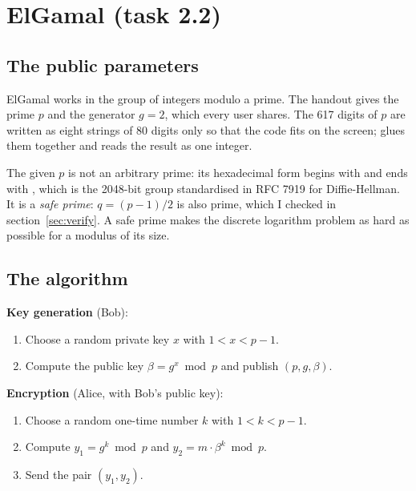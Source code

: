 \documentclass[11pt,a4paper]{article}
\begin{document}
\section{ElGamal (task 2.2)}

\subsection{The public parameters}

ElGamal works in the group of integers modulo a prime. The handout gives the prime $p$ and the
generator $g = 2$, which every user shares. The 617 digits of $p$ are written as eight strings of
80 digits only so that the code fits on the screen;  glues them together and
 reads the result as one integer.




The given $p$ is not an arbitrary prime: its hexadecimal form begins with
 and ends with , which is the 2048-bit
group  standardised in RFC 7919 for Diffie-Hellman. It is a \textit{safe prime}:
$q = (p - 1)/2$ is also prime, which I checked in section~\ref{sec:verify}. A safe prime makes the
discrete logarithm problem as hard as possible for a modulus of its size.

\subsection{The algorithm}

\textbf{Key generation} (Bob):
\begin{enumerate}
  \item Choose a random private key $x$ with $1 < x < p - 1$.
  \item Compute the public key $\beta = g^{x} \bmod p$ and publish $(p, g, \beta)$.
\end{enumerate}

\textbf{Encryption} (Alice, with Bob's public key):
\begin{enumerate}
  \item Choose a random one-time number $k$ with $1 < k < p - 1$.
  \item Compute $y_1 = g^{k} \bmod p$ and $y_2 = m \cdot \beta^{k} \bmod p$.
  \item Send the pair $(y_1, y_2)$.
\end{enumerate}
\end{document}
